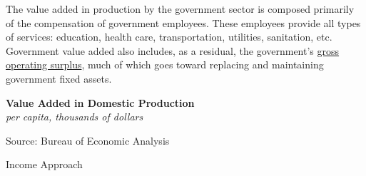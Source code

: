 \documentclass{report}
\makeatletter
\newcommand{\tbllink}[1]{\href{https://raw.githubusercontent.com/bdecon/US-chartbook/master/chartbook/data/#1}{\faTable}}
\newcommand*\short[1]{\expandafter\@gobbletwo\number\numexpr#1\relax}
\newcommand{\stdnode}[3]{\node[below, align=left, shift=({#1,#2})]{#3};}
\newcommand{\absnode}[3]{\node[below right, align=left] at (axis cs: #1,#2) {#3};}
\newcommand{\shdateaxisticks}{
		date coordinates in=x, axis line style={draw=none},
		xmax={2024-01-31},
		max space between ticks=40,	    
		xtick={{1990-01-01}, {1995-01-01}, {2000-01-01}, 
			{2005-01-01}, {2010-01-01}, {2015-01-01}, {2020-01-01}},
		minor xtick={},
		enlarge y limits={0.06}, enlarge x limits={0.01},
		xticklabel style={align=center, yshift=-2pt}, tick label style={inner sep=0pt},
		}
\newcommand{\bbar}[2]{extra #1 ticks = {{#2}}, extra #1 tick labels = ,
		extra #1 tick style = {grid=major, grid style={thick, black!25}},}
\newcommand{\stdline}[4]{\addplot[very thick, no markers, color=#1] 
		table [x=#2, y=#3, col sep=comma] {#4};	}
\newcommand{\rebars}{
		\fill[color=black!10] (axis cs:{2007-12-01},\pgfkeysvalueof{/pgfplots/ymin}) 
			rectangle (axis cs:{2009-07-01}, \pgfkeysvalueof{/pgfplots/ymax});
		\fill[color=black!10] (axis cs:{2001-03-01},\pgfkeysvalueof{/pgfplots/ymin}) 
			rectangle (axis cs:{2001-11-01}, \pgfkeysvalueof{/pgfplots/ymax});
		\fill[color=black!10] (axis cs:{2020-02-01},\pgfkeysvalueof{/pgfplots/ymin}) 
			rectangle (axis cs:{2020-05-01}, \pgfkeysvalueof{/pgfplots/ymax});}
\makeatother
\begin{document}
{\begin{minipage}{1.0\textwidth}
\small The value added in production by the government sector is composed primarily of the compensation of government employees. These employees provide all types of services: education, health care, transportation, utilities, sanitation, etc. Government value added also includes, as a residual, the government's \href{https://www.bea.gov/help/glossary/gross-operating-surplus}{gross operating surplus}, much of which goes toward replacing and maintaining government fixed assets. 
\end{minipage}
\vspace{1mm}

\begin{minipage}{0.375\textwidth}
\normalsize \textbf{Value Added in Domestic Production}\\
\footnotesize{\textit{per capita, thousands of dollars}}
\vspace{3.0cm}

\hspace{1mm} 

\footnotesize{Source: Bureau of Economic Analysis} \hfill \tbllink{gdpva_pc.csv}
\end{minipage} \hspace{4mm}
\begin{minipage}{0.35\textwidth}
\small 
\end{minipage}
\newpage
{}
\begin{minipage}{1.0\textwidth}    
\normalsize Income Approach
\vspace{-1mm}


\end{minipage}}
\end{document}
